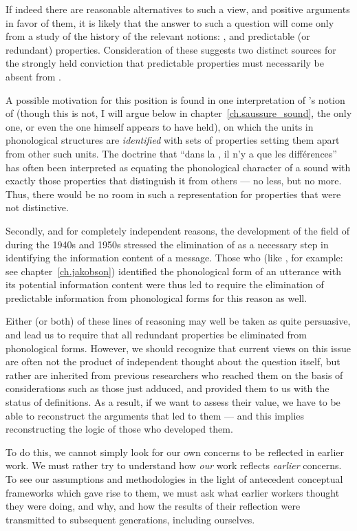 If indeed there are reasonable alternatives to such a view, and
positive arguments in favor of them, it is likely that the answer to
such a question will come only from a study of the history of the
relevant notions: , and predictable (or
redundant) properties. Consideration of these suggests two distinct
sources for the strongly held conviction that predictable properties
must necessarily be absent from .

A possible motivation for this position is found in one interpretation
of {\Saussure}'s notion of  (though this is not, I will
argue below in chapter~\ref{ch.saussure_sound}, the only one, or even
the one {\Saussure} himself appears to have held), on which the units in
phonological structures are \emph{identified} with sets of properties
setting them apart from other such units.  The doctrine that ``dans la
, il n'y a que les différences'' has often been interpreted as
equating the phonological character of a sound with exactly those
properties that distinguish it from others --- no less, but no more.
Thus, there would be no room in such a representation for properties
that were not distinctive.

Secondly, and for completely independent reasons, the development of
the field of  during the 1940s and 1950s stressed
the elimination of  as a necessary step in identifying the
information content of a message.  Those who (like {\Jakobson}, for
example: see chapter~\ref{ch.jakobson}) identified the phonological
form of an utterance with its potential information content were thus
led to require the elimination of predictable information from
phonological forms for this reason as well.

Either (or both) of these lines of reasoning may well be taken as
quite persuasive, and lead us to require that all redundant properties
be eliminated from phonological forms.  However, we should recognize
that current views on this issue are often not the product of
independent thought about the question itself, but rather are
inherited from previous researchers who reached them on the basis of
considerations such as those just adduced, and provided them to us
with the status of definitions.  As a result, if we want to assess
their value, we have to be able to reconstruct the arguments that led
to them --- and this implies reconstructing the logic of those who
developed them.

To do this, we cannot simply look for our own concerns to be reflected
in earlier work.  We must rather try to understand how \emph{our}
work reflects \emph{earlier} concerns.  To see our assumptions and
methodologies in the light of antecedent conceptual frameworks which
gave rise to them, we must ask what earlier workers thought they were
doing, and why, and how the results of their reflection were
transmitted to subsequent generations, including ourselves.


